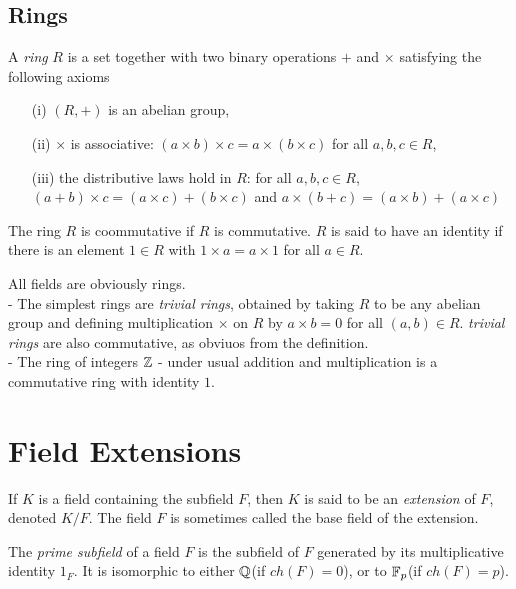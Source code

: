 \subsection{Rings}

\begin{definition}
  A \textit{ring} $R$ is a set together with two binary operations $+$ and $\times$ satisfying
  the following axioms

  \begin{itemize}
    \item[(i)]{
        $(R,+)$ is an abelian group,
      }
    \item[(ii)]{
        $\times$ is associative: $(a\times b)\times c=a\times(b\times c)$ for all $a,b,c\in R$,
      }
    \item[(iii)]{
        the distributive laws hold in $R$: for all $a,b,c\in R$,
        $(a+b)\times c=(a\times c)+(b\times c)$ and $a\times(b+c)=(a\times b)+(a\times c)$
      }
  \end{itemize}

  The ring $R$ is coommutative if $R$ is commutative. $R$ is said to have an identity if there
  is an element $1\in R$ with $1\times a=a\times 1$ for all $a\in R$. \cite{dummit}
\end{definition}

\begin{ex}
  All fields are obviously rings.\\
   - The simplest rings are \textit{trivial rings}, obtained by taking $R$ to be any abelian
  group and defining multiplication $\times$ on $R$ by $a\times b=0$ for all $(a,b)\in R$.
  \textit{trivial rings} are also commutative, as obviuos from the definition.\\
   - The ring of integers $\mathbb{Z}$ - under usual addition and multiplication is a commutative ring
  with identity $1$.
\end{ex}

\section{Field Extensions}

\begin{definition}
  If $K$ is a field containing the subfield $F$, then $K$ is said to be an \textit{extension} of
  $F$, denoted $K/F$. The field $F$ is sometimes called the base field of the extension.
  \cite{dummit}
\end{definition}

\begin{definition}
  The \textit{prime subfield} of a field $F$ is the subfield of $F$ generated by its
  multiplicative identity $1_F$. It is isomorphic to either $\mathbb{Q}$(if $ch(F)=0$), or to
  $\mathbb{F}_p$(if $ch(F)=p$). \cite{dummit}
\end{definition}

